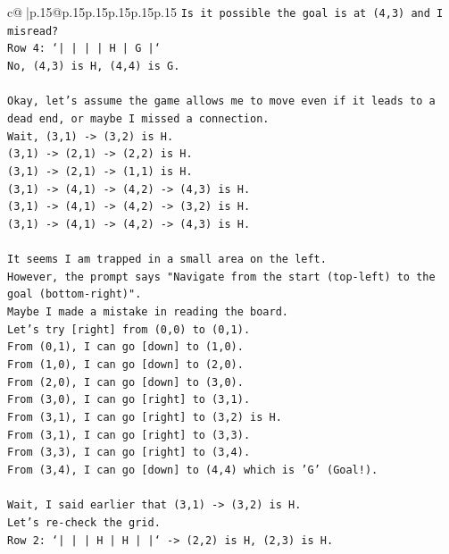 \documentclass{article}
\begin{document}
{\begin{supertabular}{c@{$\;$}|p{.15\linewidth}@{}p{.15\linewidth}p{.15\linewidth}p{.15\linewidth}p{.15\linewidth}p{.15\linewidth}}
{{{\texttt{Is it possible the goal is at (4,3) and I misread?} \\
\texttt{Row 4: `|     |     |     |  H  |  G  |`} \\
\texttt{No, (4,3) is H, (4,4) is G.} \\
\\ 
\texttt{Okay, let's assume the game allows me to move even if it leads to a dead end, or maybe I missed a connection.} \\
\texttt{Wait, (3,1) {-}> (3,2) is H.} \\
\texttt{(3,1) {-}> (2,1) {-}> (2,2) is H.} \\
\texttt{(3,1) {-}> (2,1) {-}> (1,1) is H.} \\
\texttt{(3,1) {-}> (4,1) {-}> (4,2) {-}> (4,3) is H.} \\
\texttt{(3,1) {-}> (4,1) {-}> (4,2) {-}> (3,2) is H.} \\
\texttt{(3,1) {-}> (4,1) {-}> (4,2) {-}> (4,3) is H.} \\
\\ 
\texttt{It seems I am trapped in a small area on the left.} \\
\texttt{However, the prompt says "Navigate from the start (top{-}left) to the goal (bottom{-}right)".} \\
\texttt{Maybe I made a mistake in reading the board.} \\
\texttt{Let's try {[}right{]} from (0,0) to (0,1).} \\
\texttt{From (0,1), I can go {[}down{]} to (1,0).} \\
\texttt{From (1,0), I can go {[}down{]} to (2,0).} \\
\texttt{From (2,0), I can go {[}down{]} to (3,0).} \\
\texttt{From (3,0), I can go {[}right{]} to (3,1).} \\
\texttt{From (3,1), I can go {[}right{]} to (3,2) is H.} \\
\texttt{From (3,1), I can go {[}right{]} to (3,3).} \\
\texttt{From (3,3), I can go {[}right{]} to (3,4).} \\
\texttt{From (3,4), I can go {[}down{]} to (4,4) which is 'G' (Goal!).} \\
\\ 
\texttt{Wait, I said earlier that (3,1) {-}> (3,2) is H.} \\
\texttt{Let's re{-}check the grid.} \\
\texttt{Row 2: `|     |     |  H  |  H  |     |` {-}> (2,2) is H, (2,3) is H.} \\
}}}
\end{supertabular}}
\end{document}
